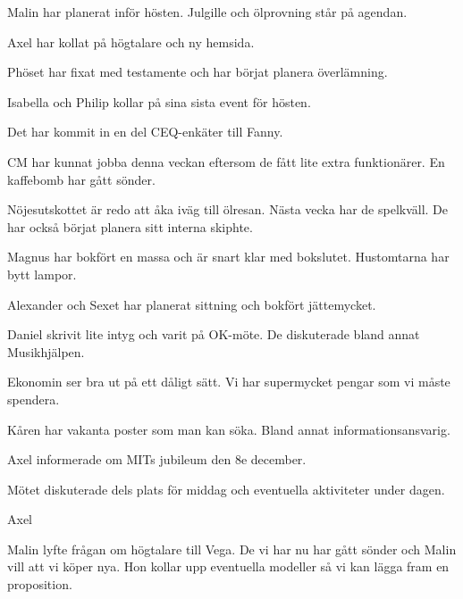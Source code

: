\documentclass[10pt]{article}
\begin{document}
\begin{paragrafer}
\begin{paragrafer}

		Malin har planerat inför hösten. Julgille och ölprovning står på agendan. 

		Axel har kollat på högtalare och ny hemsida.

		Phöset har fixat med testamente och har börjat planera överlämning.

		Isabella och Philip kollar på sina sista event för hösten.

		Det har kommit in en del CEQ-enkäter till Fanny.

		CM har kunnat jobba denna veckan eftersom de fått lite extra funktionärer. En kaffebomb har gått sönder.

		Nöjesutskottet är redo att åka iväg till ölresan. Nästa vecka har de spelkväll. De har också börjat planera sitt interna skiphte. 

		Magnus har bokfört en massa och är snart klar med bokslutet. Hustomtarna har bytt lampor. 

		Alexander och Sexet har planerat sittning och bokfört jättemycket.

		Daniel skrivit lite intyg och varit på OK-möte. De diskuterade bland annat Musikhjälpen. 


		Ekonomin ser bra ut på ett dåligt sätt. Vi har supermycket pengar som vi måste spendera.


		Kåren har vakanta poster som man kan söka. Bland annat informationsansvarig. 


		Axel informerade om MITs jubileum den 8e december. 

	\end{paragrafer}

	
	Mötet diskuterade dels plats för middag och eventuella aktiviteter under dagen. 

	Axel 

	\Mbaby


	Malin lyfte frågan om högtalare till Vega. De vi har nu har gått sönder och Malin vill att vi köper nya. Hon kollar upp eventuella modeller så vi kan lägga fram en proposition.


\end{paragrafer}
\end{document}
